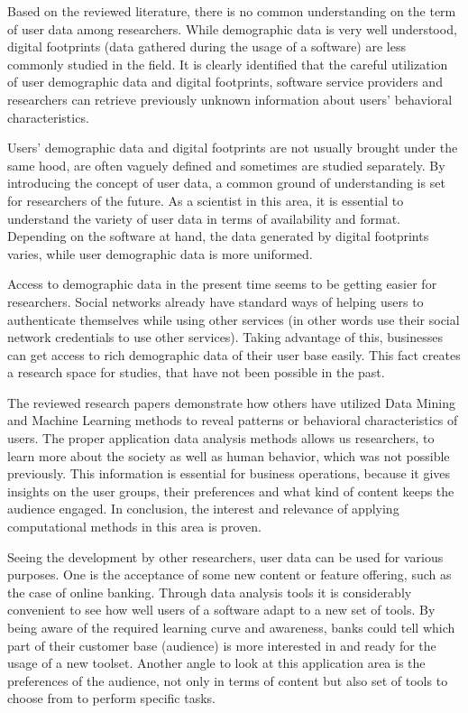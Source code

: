 Based on the reviewed literature, there is no common understanding on the term of user data among researchers. While demographic data is very well understood, digital footprints (data gathered during the usage of a software) are less commonly studied in the field. It is clearly identified that the careful utilization of user demographic data and digital footprints, software service providers and researchers can retrieve previously unknown information about users' behavioral characteristics. 

Users' demographic data and digital footprints are not usually brought under the same hood, are often vaguely defined and sometimes are studied separately. By introducing the concept of user data, a common ground of understanding is set for researchers of the future. As a scientist in this area, it is essential to understand the variety of user data in terms of availability and format. Depending on the software at hand, the data generated by digital footprints varies, while user demographic data is more uniformed.

Access to demographic data in the present time seems to be getting easier for researchers. Social networks already have standard ways of helping users to authenticate themselves while using other services (in other words use their social network credentials to use other services). Taking advantage of this, businesses can get access to rich demographic data of their user base easily. This fact creates a research space for studies, that have not been possible in the past. 

The reviewed research papers demonstrate how others have utilized Data Mining and Machine Learning methods to reveal patterns or behavioral characteristics of users. The proper application data analysis methods allows us researchers, to learn more about the society as well as human behavior, which was not possible previously. This information is essential for business operations, because it gives insights on the user groups, their preferences and what kind of content keeps the audience engaged. In conclusion, the interest and relevance of applying computational methods in this area is proven.

Seeing the development by other researchers, user data can be used for various purposes. One is the acceptance of some new content or feature offering, such as the case of online banking. Through data analysis tools it is considerably convenient to see how well users of a software adapt to a new set of tools. By being aware of the required learning curve and awareness, banks could tell which part of their customer base (audience) is more interested in and ready for the usage of a new toolset. Another angle to look at this application area is the preferences of the audience, not only in terms of content but also set of tools to choose from to perform specific tasks. 

